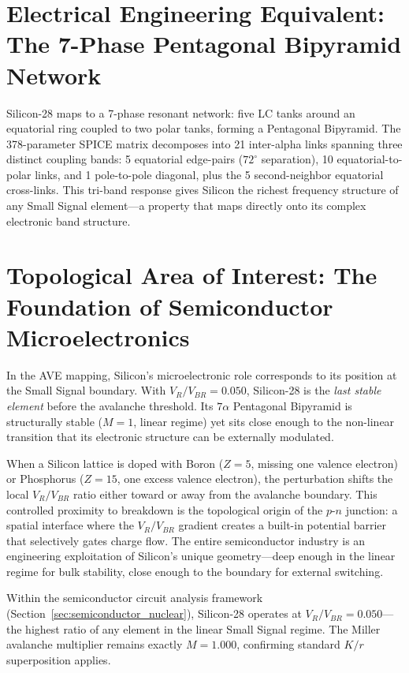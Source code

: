 \section{Electrical Engineering Equivalent: The 7-Phase Pentagonal Bipyramid Network}
Silicon-28 maps to a 7-phase resonant network: five LC tanks around an equatorial ring coupled to two polar tanks, forming a Pentagonal Bipyramid. The 378-parameter SPICE matrix decomposes into 21 inter-alpha links spanning three distinct coupling bands: 5 equatorial edge-pairs ($72^\circ$ separation), 10 equatorial-to-polar links, and 1 pole-to-pole diagonal, plus the 5 second-neighbor equatorial cross-links. This tri-band response gives Silicon the richest frequency structure of any Small Signal element---a property that maps directly onto its complex electronic band structure.

\section{Topological Area of Interest: The Foundation of Semiconductor Microelectronics}
In the AVE mapping, Silicon's microelectronic role corresponds to its position at the Small Signal boundary. With $V_R/V_{BR} = 0.050$, Silicon-28 is the \textit{last stable element} before the avalanche threshold. Its $7\alpha$ Pentagonal Bipyramid is structurally stable ($M = 1$, linear regime) yet sits close enough to the non-linear transition that its electronic structure can be externally modulated.

When a Silicon lattice is doped with Boron ($Z=5$, missing one valence electron) or Phosphorus ($Z=15$, one excess valence electron), the perturbation shifts the local $V_R/V_{BR}$ ratio either toward or away from the avalanche boundary. This controlled proximity to breakdown is the topological origin of the $p$-$n$ junction: a spatial interface where the $V_R/V_{BR}$ gradient creates a built-in potential barrier that selectively gates charge flow. The entire semiconductor industry is an engineering exploitation of Silicon's unique geometry---deep enough in the linear regime for bulk stability, close enough to the boundary for external switching.


Within the semiconductor circuit analysis framework (Section~\ref{sec:semiconductor_nuclear}), Silicon-28 operates at $V_R / V_{BR} = 0.050$---the highest ratio of any element in the linear Small Signal regime. The Miller avalanche multiplier remains exactly $M = 1.000$, confirming standard $K/r$ superposition applies.

